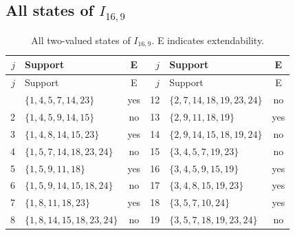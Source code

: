 \documentclass[aps,pra,reprint,superscriptaddress,longbibliography,nofootinbib,floatfix,10pt]{revtex4-2}
\theoremstyle{definition}
\begin{document}
\subsection{All states of \texorpdfstring{$I_{16,9}$}{gadget 3d}}
\begingroup\footnotesize\setlength{\tabcolsep}{3pt}\setlength{\LTpre}{5pt}\setlength{\LTpost}{8pt}
\begin{longtable}{rlc@{\qquad}rlc}
\caption{All two-valued states of $I_{16,9}$. E indicates extendability.}\label{tab:states-3d}\\\toprule $j$ & Support & E & $j$ & Support & E\\\midrule\endfirsthead
\toprule $j$ & Support & E & $j$ & Support & E\\\midrule\endhead\bottomrule\endfoot
1 & $\{1,\allowbreak 4,\allowbreak 5,\allowbreak 7,\allowbreak 14,\allowbreak 23\}$ & yes & 12 & $\{2,\allowbreak 7,\allowbreak 14,\allowbreak 18,\allowbreak 19,\allowbreak 23,\allowbreak 24\}$ & no\\
2 & $\{1,\allowbreak 4,\allowbreak 5,\allowbreak 9,\allowbreak 14,\allowbreak 15\}$ & no & 13 & $\{2,\allowbreak 9,\allowbreak 11,\allowbreak 18,\allowbreak 19\}$ & yes\\
3 & $\{1,\allowbreak 4,\allowbreak 8,\allowbreak 14,\allowbreak 15,\allowbreak 23\}$ & yes & 14 & $\{2,\allowbreak 9,\allowbreak 14,\allowbreak 15,\allowbreak 18,\allowbreak 19,\allowbreak 24\}$ & no\\
4 & $\{1,\allowbreak 5,\allowbreak 7,\allowbreak 14,\allowbreak 18,\allowbreak 23,\allowbreak 24\}$ & no & 15 & $\{3,\allowbreak 4,\allowbreak 5,\allowbreak 7,\allowbreak 19,\allowbreak 23\}$ & no\\
5 & $\{1,\allowbreak 5,\allowbreak 9,\allowbreak 11,\allowbreak 18\}$ & yes & 16 & $\{3,\allowbreak 4,\allowbreak 5,\allowbreak 9,\allowbreak 15,\allowbreak 19\}$ & yes\\
6 & $\{1,\allowbreak 5,\allowbreak 9,\allowbreak 14,\allowbreak 15,\allowbreak 18,\allowbreak 24\}$ & no & 17 & $\{3,\allowbreak 4,\allowbreak 8,\allowbreak 15,\allowbreak 19,\allowbreak 23\}$ & yes\\
7 & $\{1,\allowbreak 8,\allowbreak 11,\allowbreak 18,\allowbreak 23\}$ & yes & 18 & $\{3,\allowbreak 5,\allowbreak 7,\allowbreak 10,\allowbreak 24\}$ & yes\\
8 & $\{1,\allowbreak 8,\allowbreak 14,\allowbreak 15,\allowbreak 18,\allowbreak 23,\allowbreak 24\}$ & no & 19 & $\{3,\allowbreak 5,\allowbreak 7,\allowbreak 18,\allowbreak 19,\allowbreak 23,\allowbreak 24\}$ & no\\

\end{longtable}
\end{document}

